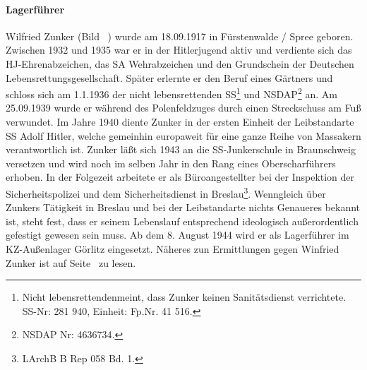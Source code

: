 \paragraph{Lagerführer}
Wilfried Zunker (Bild ~) wurde am 18.09.1917 in Fürstenwalde / Spree geboren. Zwischen 1932 und 1935 war er in der Hitlerjugend aktiv und verdiente sich das HJ-Ehren\-ab\-zei\-chen, das SA Wehrabzeichen und den Grundschein der Deutschen Lebensrettungsgesellschaft. Später erlernte er den Beruf eines Gärtners und schloss sich am 1.1.1936 der \glqq nicht lebensrettenden SS\grqq\footnote{\glqq Nicht lebensrettenden\grqq meint, dass Zunker keinen Sanitätsdienst verrichtete. SS-Nr: 281 940, Einheit: Fp.Nr. 41 516.} und NSDAP\footnote{NSDAP Nr: 4636734.} an.
\newline
Am 25.09.1939 wurde er während des Polenfeldzuges durch einen Streckschuss am Fuß verwundet.
Im Jahre 1940 diente Zunker in der ersten Einheit der \glqq Leibstandarte SS Adolf Hitler\grqq, welche gemeinhin europaweit für eine ganze Reihe von Massakern verantwortlich ist. Zunker läßt sich 1943 an die SS-Junkerschule in Braunschweig versetzen und wird noch im selben Jahr in den Rang eines Oberscharführers erhoben. In der Folgezeit arbeitete er als Büroangestellter bei der Inspektion der Sicherheitspolizei und dem Sicherheitsdienst in Breslau\footnote{LArchB B Rep 058 Bd. 1.}.
\newline
Wenngleich über Zunkers Tätigkeit in Breslau und bei der Leibstandarte nichts Genaueres bekannt ist, steht fest, dass er seinem Lebenslauf entsprechend ideologisch außerordentlich gefestigt gewesen sein muss. Ab dem 8. August 1944 wird er als Lagerführer im KZ-Außenlager Görlitz eingesetzt. Näheres zun Ermittlungen gegen Winfried Zunker ist auf Seite~\pageref{zunker_ahndung} zu lesen.
~\newline

\label{zunkerfoto}
\begin{minipage}[b]{.47\linewidth}
\end{minipage}
\hspace{20pt}
\begin{minipage}[b]{.47\linewidth}
\end{minipage}
\vspace{-25pt}






